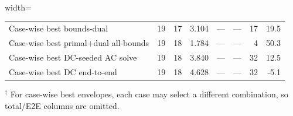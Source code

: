 \begin{table}[!t]
\begin{adjustbox}{width=\textwidth}
\begin{tabular}{p{6.2cm}rrrrrrr}
Case-wise best bounds-dual & 19 & 17 & 3.104 & ---\rlap{$^\dagger$} & ---\rlap{$^\dagger$} & 17 & 19.5 \\
Case-wise best primal+dual all-bounds & 19 & 18 & 1.784 & ---\rlap{$^\dagger$} & ---\rlap{$^\dagger$} & 4 & 50.3 \\
Case-wise best DC-seeded AC solve & 19 & 18 & 3.840 & ---\rlap{$^\dagger$} & ---\rlap{$^\dagger$} & 32 & 12.5 \\
Case-wise best DC end-to-end & 19 & 18 & 4.628 & ---\rlap{$^\dagger$} & ---\rlap{$^\dagger$} & 32 & -5.1 \\
\bottomrule
\end{tabular}
\end{adjustbox}
{\footnotesize $^\dagger$ For case-wise best envelopes, each case may select a different combination, so total/E2E columns are omitted.}
\end{table}